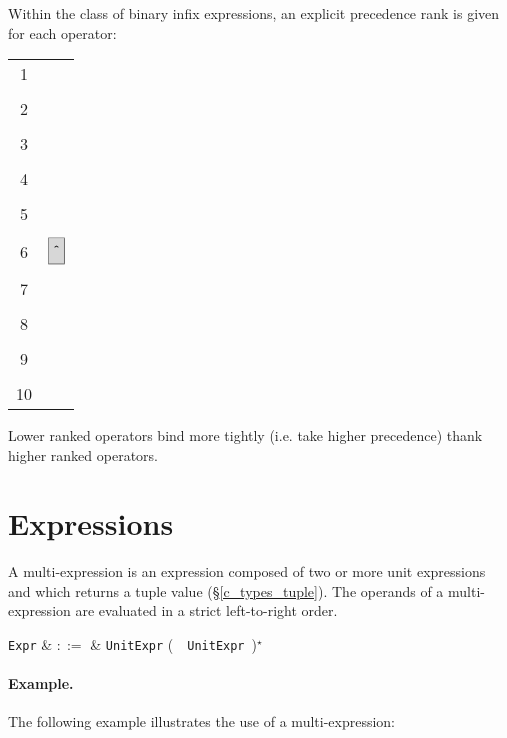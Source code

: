 Within the class of binary infix expressions, an explicit precedence rank is given for each operator:

\begin{syntax}
\begin{tabular}{cl}
1 & \token{*} \token{/}\\
&\\
2 & \token{+} \token{-}\\
&\\
3 & \token{==} \token{!=} \token{<} \token{<=} \token{>=} \token{>}\\
&\\
4 & \token{\&}\\
&\\
5 & \token{|}\\
&\\
6 & $\token{\^}$\\
&\\
7 & \token{\&\&}\\
&\\
8 & \token{||}\\
&\\
9 & \token{==>}\\
&\\
10 & \token{<==>}\\
\end{tabular}
\end{syntax}

Lower ranked operators bind more tightly (i.e. take higher precedence) thank higher ranked operators.


\section{Expressions}
\label{c_expr_tuple}
A multi-expression is an expression composed of two or more unit expressions and which returns a tuple value (\S\ref{c_types_tuple}).  The operands of a multi-expression are evaluated in a strict left-to-right order.

\begin{syntax}
  \verb+Expr+ & $::=$ & \verb+UnitExpr+ \big(\ \token{,}\ \verb+UnitExpr+\ \big)$^\star$ \\
\end{syntax}

\paragraph{Example.}  The following example illustrates the use of a multi-expression:

